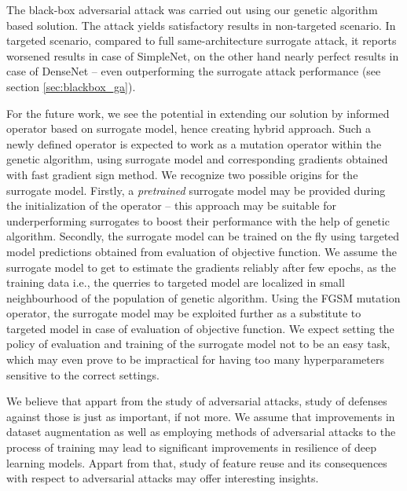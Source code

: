 The black-box adversarial attack was carried out using our genetic algorithm based solution. The attack yields satisfactory results in non-targeted scenario. In targeted scenario, compared to full same-architecture surrogate attack, it reports worsened results in case of SimpleNet, on the other hand nearly perfect results in case of DenseNet -- even outperforming the surrogate attack performance (see section \ref{sec:blackbox_ga}).

For the future work, we see the potential in extending our solution by informed operator based on surrogate model, hence creating hybrid approach. Such a newly defined operator is expected to work as a mutation operator within the genetic algorithm, using surrogate model and corresponding gradients obtained with fast gradient sign method. We recognize two possible origins for the surrogate model. Firstly, a \emph{pretrained} surrogate model may be provided during the initialization of the operator -- this approach may be suitable for underperforming surrogates to boost their performance with the help of genetic algorithm. Secondly, the surrogate model can be trained on the fly using targeted model predictions obtained from evaluation of objective function. We assume the surrogate model to get to estimate the gradients reliably after few epochs, as the training data i.e., the querries to targeted model are localized in small neighbourhood of the population of genetic algorithm. Using the FGSM mutation operator, the surrogate model may be exploited further as a substitute to targeted model in case of evaluation of objective function. We expect setting the policy of evaluation and training of the surrogate model not to be an easy task, which may even prove to be impractical for having too many hyperparameters sensitive to the correct settings.

We believe that appart from the study of adversarial attacks, study of defenses against those is just as important, if not more. We assume that improvements in dataset augmentation as well as employing methods of adversarial attacks to the process of training may lead to significant improvements in resilience of deep learning models. Appart from that, study of feature reuse and its consequences with respect to adversarial attacks may offer interesting insights.
